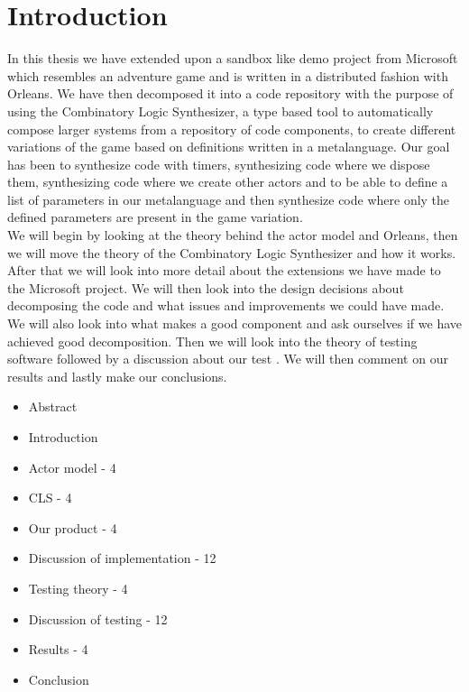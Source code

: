 \section{Introduction}
In this thesis we have extended upon a sandbox like demo project from Microsoft \cite{AdventureGame} which resembles an adventure game and is written in a distributed fashion with Orleans. We have then decomposed it into a code repository with the  purpose of using the Combinatory Logic Synthesizer, a type based tool to automatically compose larger systems from a repository of code components, to create different variations of the game based on definitions written in a metalanguage. Our goal has been to synthesize code with timers, synthesizing code where we dispose them, synthesizing code where we create other actors and to be able to define a list of parameters in our metalanguage and then synthesize code where only the defined parameters are present in the game variation. \\
We will begin by looking at the theory behind the actor model and Orleans, then we will move the theory of the Combinatory Logic Synthesizer and how it works. After that we will look into more detail about the extensions we have made to the Microsoft project. We will then look into the design decisions about decomposing the code and what issues and improvements we could have made. We will also look into what makes a good component and ask ourselves if we have achieved good decomposition. Then we will look into the theory of testing software followed by a discussion about our test . We will then comment on our results and lastly make our conclusions.
\begin{itemize}
	\item Abstract
	\item Introduction
	\item Actor model - 4
	\item CLS - 4
	\item Our product - 4
	\item Discussion of implementation - 12
	\item Testing theory - 4
	\item Discussion of testing - 12
	\item Results - 4
	\item Conclusion
\end{itemize}